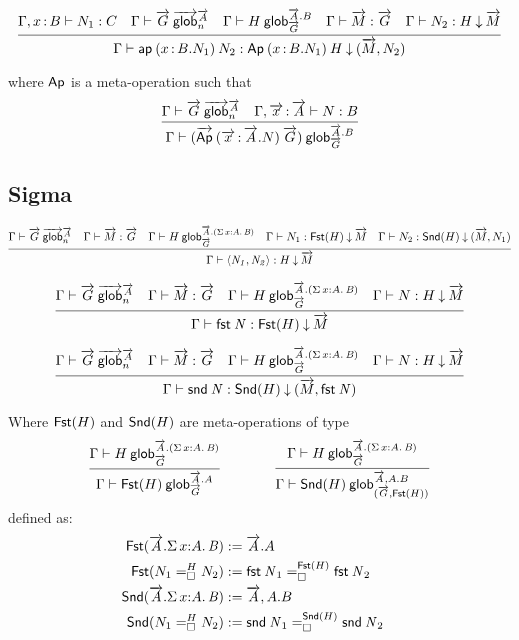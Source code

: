 \[
\infer
  {\ofdepglob{\Gamma}{\apd{(\tptm xB.N_1)}{N_2}}
             {\Apd{(\tptm xB.N_1)}{H}}{(\tel M,N_2)}}
  {\ofglob{\Gamma,\tptm xB}{N_1}{C}
  &\wfglob{\Gamma}{\tel G}{\tel A}{n}
  &\wfdepglob{\Gamma}{H}{\tel A.B}{\tel G}
  &\ofglob{\Gamma}{\tel M}{\tel G}
  &\ofdepglob{\Gamma}{N_2}{H}{\tel M}}
\]

where $\dsd{Ap}$ is a meta-operation such that
\[\infer
  {\wfdepglob{\Gamma}{(\Aptel{(\teltm xA.N)}{\tel G})}{\tel A.B}{\tel G}}
  {\wfglob{\Gamma}{\tel G}{\tel A}n
  &\ofglob{\Gamma,\teltm xA}{N}{B}}
\]


\subsection{Sigma}

\begin{small}\[
\infer
  {\ofdepglob{\Gamma}{\pair{N_1}{N_2}}{H}{\tel M}}
  {\wfglob{\Gamma}{\tel G}{\tel A}n
  &\ofglob{\Gamma}{\tel M}{\tel G}
  &\wfdepglob{\Gamma}{H}{\tel A.(\sigmacl xAB)}{\tel G}
  &\ofdepglob{\Gamma}{N_1}{\Fstsigma H}{\tel M}
  &\ofdepglob{\Gamma}{N_2}{\Sndsigma H}{(\tel M,N_1)}}
\]\end{small}

\[
\infer
  {\ofdepglob{\Gamma}{\fst N}{\Fstsigma H}{\tel M}}
  {\wfglob{\Gamma}{\tel G}{\tel A}n
  &\ofglob{\Gamma}{\tel M}{\tel G}
  &\wfdepglob{\Gamma}{H}{\tel A.(\sigmacl xAB)}{\tel G}
  &\ofdepglob{\Gamma}{N}{H}{\tel M}}
\]

\[
\infer
  {\ofdepglob{\Gamma}{\snd N}{\Sndsigma H}{(\tel M,\fst N)}}
  {\wfglob{\Gamma}{\tel G}{\tel A}n
  &\ofglob{\Gamma}{\tel M}{\tel G}
  &\wfdepglob{\Gamma}{H}{\tel A.(\sigmacl xAB)}{\tel G}
  &\ofdepglob{\Gamma}{N}{H}{\tel M}}
\]

Where $\Fstsigma H$ and $\Sndsigma H$ are meta-operations of type
\[
\infer
  {\wfdepglob{\Gamma}{\Fstsigma H}{\tel A.A}{\tel G}}
  {\wfdepglob{\Gamma}{H}{\tel A.(\sigmacl xAB)}{\tel G}}
\qquad\qquad
\infer
  {\wfdepglob{\Gamma}{\Sndsigma H}{\tel A,A.B}{(\tel G,\Fstsigma H)}}
  {\wfdepglob{\Gamma}{H}{\tel A.(\sigmacl xAB)}{\tel G}}
\]
defined as:
\[\begin{aligned}
\Fstsigma{\tel A.\sigmacl xAB} &:= \tel A.A \\
\Fstsigma{\dhomj{H}{N_1}{N_2}{\blank}} &:=
\dhomj{\Fstsigma H}{\fst N_1}{\fst N_2}{\blank}
&\\
\Sndsigma{\tel A.\sigmacl xAB} &:= \tel A,A.B \\
\Sndsigma{\dhomj{H}{N_1}{N_2}{\blank}} &:=
\dhomj{\Sndsigma H}{\snd N_1}{\snd N_2}{\blank}
\end{aligned}\]

